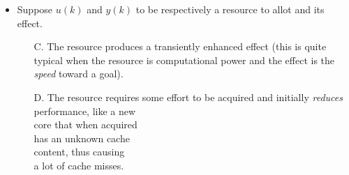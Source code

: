 \begin{frame}
 \begin{columns}
   \begin{itemize}[<+-| alert@+>]
   \item Suppose $u(k)$ and $y(k)$ to be respectively a resource to allot and its effect.
         \begin{itemize}[<+-| alert@+>]
         \item[C.] The resource produces a transiently enhanced effect (this is quite typical
                   when the resource is computational power and the effect is the \emph{speed} toward a goal).
         \item[D.] The resource requires some effort to be acquired and initially \emph{reduces}
                   performance, like a new\\
                   core that when acquired\\
                   has an unknown cache\\
                   content, thus causing\\
                   a lot of cache misses.
         \end{itemize}
   \end{itemize}
 \end{columns}
\end{frame}

